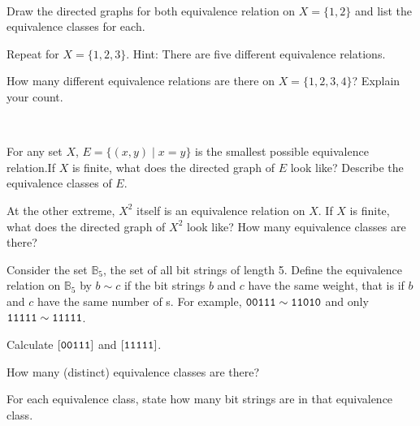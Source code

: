 \begin{exer}[\exerU] %
\label{exer_all_equiv_classes_small_finite}
~
    \begin{exerpart}
        \item Draw the directed graphs for both equivalence relation on $X = \{1,2\}$ and list the equivalence classes for each.
        \item Repeat for $X = \{1,2,3\}$.  Hint: There are five different equivalence relations.
        \item How many different equivalence relations are there on $X = \{1,2,3,4\}$?  Explain your count.
    \end{exerpart}
\end{exer}

\begin{exer}[\exerU] %
\label{exer_equiv_rel_equality}
~  
    \begin{exerpart}
        \item  For any set $X$,  $E = \{(x,y) \mid x=y\}$ is the smallest possible equivalence relation.If $X$ is finite, what does the directed graph of $E$ look like?  Describe the equivalence classes of $E$.
        \item At the other extreme,  $X^2$ itself is an equivalence relation on $X$.  If $X$ is finite, what does the directed graph of  $X^2$ look like? How many equivalence classes are there?
    \end{exerpart}
\end{exer}

\begin{exer}[\exerU] %
\label{exer_bs_equiv_same_weight}
    Consider the set $\mathbb{B}_5$, the set of all bit strings of length 5.  Define the equivalence relation on $\mathbb{B}_5$ by $b \sim c$ if the bit strings $b$ and $c$ have the same weight, that is if $b$ and $c$ have the same number of s.  For example, $\texttt{00111} \sim \texttt{11010}$ and only $\texttt{11111} \sim \texttt{11111}$.
        \begin{exerpart}
            \item Calculate $[\texttt{00111}]$ and $[\texttt{11111}]$.  
            \item How many (distinct) equivalence classes are there?
            \item For each equivalence class, state how many bit strings are in that equivalence class.
        \end{exerpart}
\end{exer}

